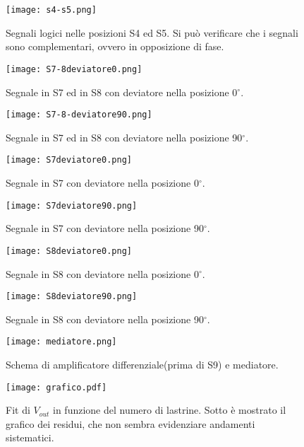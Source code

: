\begin{figure}[h]
	\centering
	\texttt{[image: s4-s5.png]}
	\caption{Segnali logici nelle posizioni S4 ed S5. Si può verificare che i segnali sono complementari, ovvero in opposizione di fase.}
	\label{f:s4-s5}
\end{figure}

\begin{figure}[h]
	\centering
	\texttt{[image: S7-8deviatore0.png]}
	\caption{Segnale in S7 ed in S8 con deviatore nella posizione 0$^\circ$.}
	\label{f:S7-8deviatore0}
\end{figure}

\begin{figure}[h]
	\centering
	\texttt{[image: S7-8-deviatore90.png]}
	\caption{Segnale in S7 ed in S8 con deviatore nella posizione 90$^\circ$.}
	\label{f:S7-8deviatore90}
\end{figure}

\begin{figure}[h]
	\centering
	\texttt{[image: S7deviatore0.png]}
	\caption{Segnale in S7 con deviatore nella posizione 0$^\circ$.}
	\label{f:S7deviatore0}
\end{figure}

\begin{figure}[h]
	\centering
	\texttt{[image: S7deviatore90.png]}
	\caption{Segnale in S7 con deviatore nella posizione 90$^\circ$.}
	\label{f:S7deviatore90}
\end{figure}

\begin{figure}[h]
	\centering
	\texttt{[image: S8deviatore0.png]}
	\caption{Segnale in S8 con deviatore nella posizione 0$^\circ$.}
	\label{f:S8deviatore0}
\end{figure}

\begin{figure}[h]
	\centering
	\texttt{[image: S8deviatore90.png]}
	\caption{Segnale in S8 con deviatore nella posizione 90$^\circ$.}
	\label{f:S8deviatore90}
\end{figure}

\begin{figure}[h]
	\centering
	\texttt{[image: mediatore.png]}
	\caption{Schema di amplificatore differenziale(prima di S9) e mediatore.}
	\label{f:Mediatore}
\end{figure}

\begin{figure}[h]
	\centering
	\texttt{[image: grafico.pdf]}
	\caption{Fit di $V_{out}$ in funzione del numero di lastrine. Sotto è mostrato il grafico dei residui, che non sembra evidenziare andamenti sistematici.}
	\label{f:Grafico}
\end{figure}